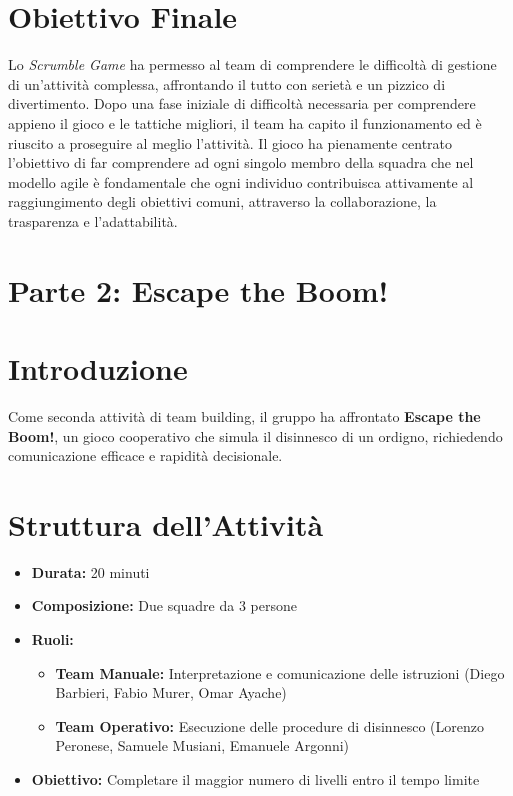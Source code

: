 \documentclass{article}
\begin{document}
\section*{Obiettivo Finale}
Lo \textit{Scrumble Game} ha permesso al team di comprendere le difficoltà di gestione di un'attività complessa, affrontando il tutto con serietà e un pizzico di divertimento. 
Dopo una fase iniziale di difficoltà necessaria per comprendere appieno il gioco e le tattiche migliori, il team ha capito il funzionamento ed è riuscito a proseguire al meglio l'attività.
Il gioco ha pienamente centrato l'obiettivo di far comprendere ad ogni singolo membro della squadra che nel modello agile è fondamentale che ogni individuo contribuisca attivamente al raggiungimento degli obiettivi comuni, attraverso la collaborazione, la trasparenza e l'adattabilità.


\section*{Parte 2: Escape the Boom!}

\section*{Introduzione}
Come seconda attività di team building, il gruppo ha affrontato \textbf{Escape the Boom!}, un gioco cooperativo che simula il disinnesco di un ordigno, richiedendo comunicazione efficace e rapidità decisionale.

\section*{Struttura dell'Attività}
\begin{itemize}
    \item \textbf{Durata:} 20 minuti
    \item \textbf{Composizione:} Due squadre da 3 persone
    \item \textbf{Ruoli:}
    \begin{itemize}
        \item \textbf{Team Manuale:} Interpretazione e comunicazione delle istruzioni (Diego Barbieri, Fabio Murer, Omar Ayache)
        \item \textbf{Team Operativo:} Esecuzione delle procedure di disinnesco (Lorenzo Peronese, Samuele Musiani, Emanuele Argonni)
    \end{itemize}
    \item \textbf{Obiettivo:} Completare il maggior numero di livelli entro il tempo limite
\end{itemize}
\end{document}

